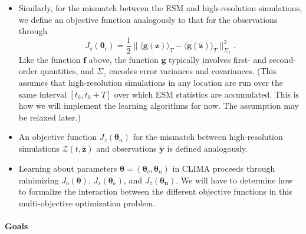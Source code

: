 \documentclass{article}
\renewcommand{\vec}[1]{\boldsymbol{{#1}}}
\begin{document}
\begin{itemize}
\begin{equation}
    \right),
    \label{e:of}
    \end{equation}
    where, for any observable $\phi$, $\phi'(t) = \phi(t) - \langle \phi \rangle_T$ denotes the fluctuation of $\phi$ about its mean $\langle \phi \rangle_T$. With $\vec{f}$ given by \eqref{e:of}, the objective function penalizes mismatch between the vectors of mean values $\langle \vec{y} \rangle_T$ and $\langle \vec{\tilde y}\rangle_T$ and between the covariance components $\langle y_i' y_j' \rangle_T$ and  $\langle \tilde y_i' \tilde y_j' \rangle_T$ for some indices $i$ and $j$. However, $\vec{f}$ may also include higher-order statistics, such as high percentiles of the precipitation distribution, to penalize mismatches between simulated and observed statistics of precipitation extremes. 
    \item Similarly, for the mismatch between the ESM and high-resolution simulations, we define an objective function analogously to that for the observations through
    \begin{equation}\label{e:obj_hr}
    J_s(\vec{\theta}_c)=\frac12\| \langle \vec{g}(\vec{z})  \rangle_T - \langle \vec{g}(\vec{\tilde z})
    \rangle_T \|_{\Sigma_z}^2.
    \end{equation}
    Like the function $\vec{f}$ above, the function $\vec{g}$  typically involves first- and second-order quantities, and $\Sigma_z$ encodes error variances and covariances. (This assumes that high-resolution simulations in any location are run over the same interval $[t_0, t_0+T]$ over which ESM statistics are accumulated. This is how we will implement the learning algorithms for now. The assumption may be relaxed later.) 
    \item An objective function $J_z(\vec{\theta}_n)$ for the mismatch between high-resolution simulations  $\mathcal{Z}(t, \vec{\tilde z})$ and observations $\vec{\tilde y}$ is defined analogously. 
    \item Learning about parameters $\vec{\theta} = (\vec{\theta}_c, \vec{\theta}_n)$ in CLIMA proceeds through minimizing $J_o(\vec{\theta})$, $J_s(\vec{\theta_c})$, and $J_z(\vec{\theta_n})$. We will have to determine how to formalize the interaction between the different objective functions in this multi-objective optimization problem.
\end{itemize}

\paragraph{Goals}
\end{document}
